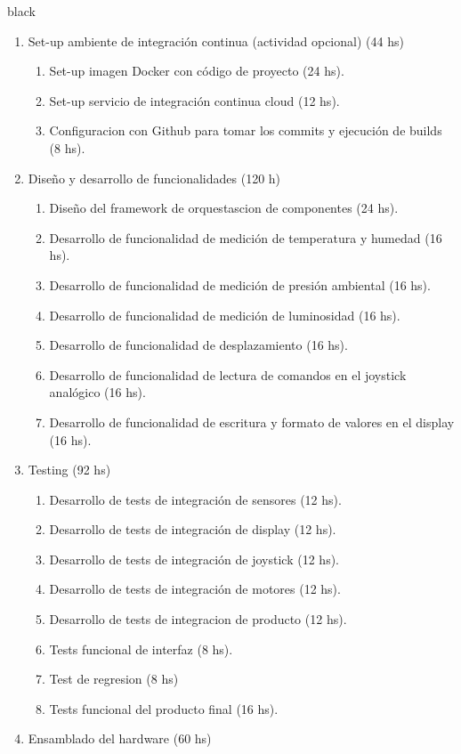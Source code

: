 \documentclass[
11pt, %
]{charter}
\begin{document}
\begin{consigna}{black}
\begin{enumerate}
\begin{enumerate}
	\end{enumerate}
\item Set-up ambiente de integración continua (actividad opcional) (44 hs)
	\begin{enumerate}
	\item Set-up imagen Docker con código de proyecto (24 hs).
	\item Set-up servicio de integración continua cloud (12 hs).
	\item Configuracion con Github para tomar los commits y ejecución de builds (8 hs).
	\end{enumerate}
\item Diseño y desarrollo de funcionalidades (120 h)
	\begin{enumerate}
	\item Diseño del framework de orquestascion de componentes (24 hs).
	\item Desarrollo de funcionalidad de medición de temperatura y humedad (16 hs).
	\item Desarrollo de funcionalidad de medición de presión ambiental (16 hs).
	\item Desarrollo de funcionalidad de medición de luminosidad (16 hs).
	\item Desarrollo de funcionalidad de desplazamiento (16 hs).
	\item Desarrollo de funcionalidad de lectura de comandos en el joystick analógico (16 hs).
	\item Desarrollo de funcionalidad de escritura y formato de valores en el display (16 hs).
	\end{enumerate}
\item Testing (92 hs)
	\begin{enumerate}
	\item Desarrollo de tests de integración de sensores (12 hs).
	\item Desarrollo de tests de integración de display (12 hs).
	\item Desarrollo de tests de integración de joystick (12 hs).
	\item Desarrollo de tests de integración de motores (12 hs).
	\item Desarrollo de tests de integracion de producto (12 hs).
	\item Tests funcional de interfaz (8 hs).
	\item Test de regresion (8 hs)
	\item Tests funcional del producto final (16 hs).
	\end{enumerate}
\item Ensamblado del hardware (60 hs)

\end{enumerate}
\end{consigna}
\end{document}
